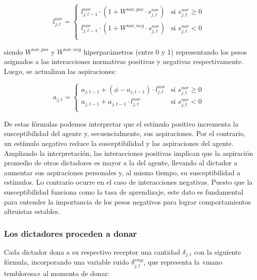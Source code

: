 \documentclass[12pt,a4paper]{article}
\begin{document}
\begin{equation}
l_{j,t}^{nor} = 
\begin{cases}
l_{j,t-1}^{nor} \cdot (1+W^{nor,pos} \cdot s_{j,t}^{nor}) & \text{si } s_{j,t}^{nor} \geq 0 \\
l_{j,t-1}^{nor} \cdot (1+W^{nor,neg} \cdot s_{j,t}^{nor}) & \text{si } s_{j,t}^{nor} < 0 \\
\end{cases}
\end{equation}

siendo $W^{nor,pos}$ y $W^{nor,neg}$ hiperparámetros (entre 0 y 1) representando los pesos 
asignados a las interacciones normativas positivas y negativas respectivamente. Luego, se
actualizan las aspiraciones:

\begin{equation}
a_{j,t} =
\begin{cases}
a_{j,t-1} + (\phi - a_{j,t-1}) \cdot l_{j,t}^{nor} & \text{si } s_{j,t}^{nor} \geq 0 \\
a_{j,t-1} + a_{j,t-1} \cdot l_{j,t}^{nor} & \text{si } s_{j,t}^{nor} < 0 \\
\end{cases}
\label{aspiracion_dictador}
\end{equation}

De estas fórmulas podemos interpretar que el estímulo positivo incrementa la susceptibilidad del agente y,
secuencialmente, sus aspiraciones. Por el contrario, un estímulo negativo reduce la susceptibilidad y las
aspiraciones del agente. Ampliando la interpretación, las interacciones positivas implican que la aspiración
promedio de otros dictadores es mayor a la del agente, llevando al dictador a aumentar sus aspiraciones 
personales y, al mismo tiempo, su susceptibilidad a estímulos. Lo contrario ocurre en el caso de interacciones 
negativas. Puesto que la susceptibilidad funciona como la tasa de aprendizaje, este dato es fundamental
para entender la importancia de los pesos negativos para lograr comportamientos altruistas estables.

\subsubsection{Los dictadores proceden a donar}

Cada dictador dona a su respectivo receptor una cantidad $\delta_{j,t}$ con la siguiente fórmula, incorporando
una variable ruido $\delta_{j,t}^{emp}$, que representa la «mano temblorosa» al momento de donar:
\end{document}

